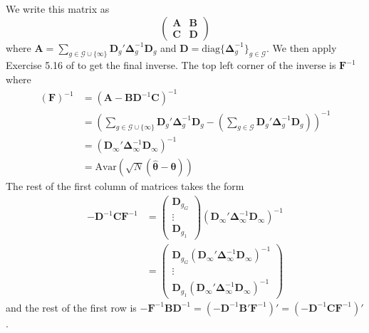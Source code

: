 \documentclass[12pt]{article}
\begin{document}
We write this matrix as 
\begin{equation*}
    \begin{pmatrix}
        \bm A & \bm B\\
        \bm C & \bm D
    \end{pmatrix}
\end{equation*}
where $\bm A = \sum_{g \in \mathcal{G}\cup \{\infty\}} \bm D_g' \bm \Delta_g^{-1} \bm D_g$ and $\bm D = \text{diag} \{ \bm \Delta_g^{-1} \}_{g \in \mathcal{G}}$. We then apply Exercise 5.16 of \citet{abadir2005matrix} to get the final inverse. The top left corner of the inverse is $\bm F^{-1}$ where
\begin{align*}
    (\bm F)^{-1} 
    &= (\bm A - \bm B \bm D^{-1} \bm C)^{-1}\\
    &= \left( \sum_{g \in \mathcal{G}\cup\{\infty\}} \bm D_g' \bm \Delta_g^{-1} \bm D_g - \left( \sum_{g \in \mathcal{G}} \bm D_g' \bm \Delta_g^{-1} \bm D_g \right) \right)^{-1}\\
    &= (\bm D_{\infty}' \bm \Delta_{\infty}^{-1} \bm D_{\infty})^{-1}\\
    &= \text{Avar}(\sqrt{N}(\widehat{\bm \theta} - \bm \theta))
\end{align*}
The rest of the first column of matrices takes the form
\begin{align*}
    -\bm D^{-1} \bm C \bm F^{-1}
    &=
    \begin{pmatrix}
        \bm D_{g_G}\\
        \vdots\\
        \bm D_{g_1}
    \end{pmatrix}
    (\bm D_{\infty}' \bm \Delta_{\infty}^{-1} \bm D_{\infty})^{-1}\\
    &=
    \begin{pmatrix}
        \bm D_{g_G} (\bm D_{\infty}' \bm \Delta_{\infty}^{-1} \bm D_{\infty})^{-1}\\
        \vdots\\
        \bm D_{g_1} (\bm D_{\infty}' \bm \Delta_{\infty}^{-1} \bm D_{\infty})^{-1}
    \end{pmatrix}
\end{align*}
and the rest of the first row is $- \bm F^{-1} \bm B \bm D^{-1} = (- \bm D^{-1} \bm B' \bm F^{-1})' = (- \bm D^{-1} \bm C \bm F^{-1})'$.
\end{document}
